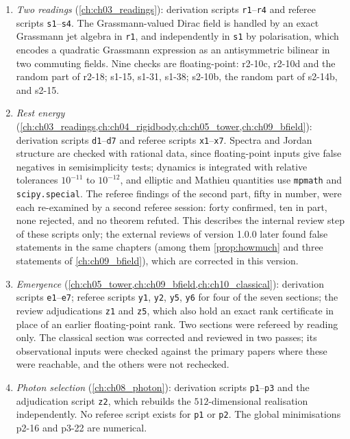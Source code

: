 \begin{enumerate}[label=(\roman*),leftmargin=2.2em]
\item \emph{Two readings} (\cref{ch:ch03_readings}): derivation scripts \texttt{r1}--\texttt{r4} and referee scripts \texttt{s1}--\texttt{s4}. The
Grassmann-valued Dirac field is handled by an exact Grassmann jet algebra in \texttt{r1}, and independently in \texttt{s1} by polarisation, which
encodes a quadratic Grassmann expression as an antisymmetric bilinear in two commuting fields. Nine checks are floating-point: r2-10c, r2-10d
and the random part of r2-18; s1-15, s1-31, s1-38; s2-10b, the random part of s2-14b, and s2-15.
\item \emph{Rest energy} (\cref{ch:ch03_readings,ch:ch04_rigidbody,ch:ch05_tower,ch:ch09_bfield}): derivation scripts \texttt{d1}--\texttt{d7} and
referee scripts \texttt{x1}--\texttt{x7}. Spectra and Jordan structure are checked with rational data, since floating-point inputs give false
negatives in semisimplicity tests; dynamics is integrated with relative tolerances $10^{-11}$ to $10^{-12}$, and elliptic and Mathieu quantities
use \texttt{mpmath} and \texttt{scipy.special}. The referee findings of the second part, fifty in number, were each re-examined by a second
referee session: forty confirmed, ten in part, none rejected, and no theorem refuted. This describes the internal review step of these
scripts only; the external reviews of version 1.0.0 later found false statements in the same chapters (among them \cref{prop:howmuch} and three
statements of \cref{ch:ch09_bfield}), which are corrected in this version.
\item \emph{Emergence} (\cref{ch:ch05_tower,ch:ch09_bfield,ch:ch10_classical}): derivation scripts \texttt{e1}--\texttt{e7}; referee scripts
\texttt{y1}, \texttt{y2}, \texttt{y5}, \texttt{y6} for four of the seven sections; the review adjudications \texttt{z1} and \texttt{z5}, which also hold an
exact rank certificate in place of an earlier floating-point rank. Two sections were refereed by reading only. The classical section
was corrected and reviewed in two passes; its observational inputs were checked against the primary papers where these were reachable, and the
others were not rechecked.
\item \emph{Photon selection} (\cref{ch:ch08_photon}): derivation scripts \texttt{p1}--\texttt{p3} and the adjudication script \texttt{z2}, which
rebuilds the $512$-dimensional realisation independently. No referee script exists for \texttt{p1} or \texttt{p2}. The global minimisations
p2-16 and p3-22 are numerical.

\end{enumerate}

